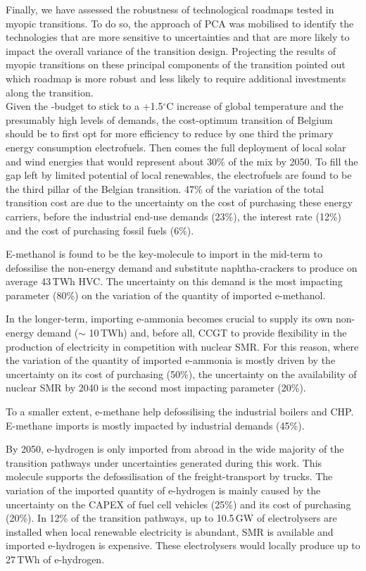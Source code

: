 Finally, we have assessed the robustness of technological roadmaps tested in myopic transitions. To do so, the approach of \acrfull{PCA} was mobilised to identify the technologies that are more sensitive to uncertainties and that are more likely to impact the overall variance of the transition design. Projecting the results of myopic transitions on these principal components of the transition pointed out which roadmap is more robust and less likely to require additional investments along the transition.\\

Given the -budget to stick to a +1.5$^{\circ}$C increase of global temperature and the presumably high levels of demands,  the cost-optimum transition of Belgium should be to first opt for more efficiency to reduce by one third the primary energy consumption electrofuels. Then comes the full deployment of local solar and wind energies that would represent about 30\% of the mix by 2050. To fill the gap left by limited potential of local renewables, the electrofuels are found to be the third pillar of the Belgian transition. 47\% of the variation of the total transition cost are due to the uncertainty on the cost of purchasing these energy carriers, before the industrial end-use demands (23\%), the interest rate (12\%) and the cost of purchasing fossil fuels (6\%). 

E-methanol is found to be the key-molecule to import in the mid-term to defossilise the non-energy demand and substitute naphtha-crackers to produce on average 43\,TWh \acrfull{HVC}. The uncertainty on this demand is the most impacting parameter (80\%) on the variation of the quantity of imported e-methanol. 

In the longer-term, importing e-ammonia becomes crucial to supply its own non-energy demand ($\sim$ 10\,TWh) and, before all, \acrfull{CCGT} to provide flexibility in the production of electricity in competition with nuclear \acrfull{SMR}. For this reason, where the variation of the quantity of imported e-ammonia is mostly driven by the uncertainty on its cost of purchasing (50\%), the uncertainty on the availability of nuclear \gls{SMR} by 2040 is the second most impacting parameter (20\%). 

To a smaller extent, e-methane help defossilising the industrial boilers and \acrfull{CHP}. E-methane imports is mostly impacted by industrial demands (45\%). 

By 2050, e-hydrogen is only imported from abroad in the wide majority of the transition pathways under uncertainties generated during this work.  This molecule supports the defossilisation of the freight-transport by trucks. The variation of the imported quantity of e-hydrogen is mainly caused by the uncertainty on the CAPEX of fuel cell vehicles (25\%) and its cost of purchasing (20\%). In 12\% of the transition pathways, up to 10.5\,GW of electrolysers are installed when local renewable electricity is abundant, \gls{SMR} is available and imported e-hydrogen is expensive. These electrolysers would locally produce up to 27\,TWh of e-hydrogen. 

